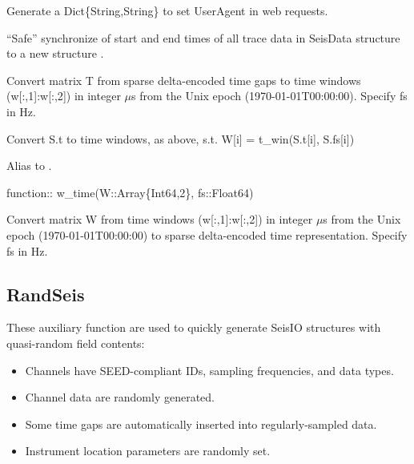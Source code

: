 \documentclass[letterpaper,11pt,english]{sphinxmanual}
\begin{document}
Generate a Dict\{String,String\} to set UserAgent in web requests.

“Safe” synchronize of start and end times of all trace data in SeisData structure  to a new structure .

\begin{fulllineitems}
\label{\detokenize{src/Appendices/function_list:t_win}}
\end{fulllineitems}


Convert matrix T from sparse delta-encoded time gaps to time windows (w{[}:,1{]}:w{[}:,2{]}) in integer \(\mu\)s from the Unix epoch (1970-01-01T00:00:00). Specify fs in Hz.


\begin{fulllineitems}
\end{fulllineitems}


Convert S.t to time windows, as above, s.t. W{[}i{]} = t\_win(S.t{[}i{]}, S.fs{[}i{]})

\begin{fulllineitems}
\label{\detokenize{src/Appendices/function_list:u2d}}
\end{fulllineitems}


Alias to .

function:: w\_time(W::Array\{Int64,2\}, fs::Float64)

Convert matrix W from time windows (w{[}:,1{]}:w{[}:,2{]}) in integer \(\mu\)s from the Unix epoch (1970-01-01T00:00:00) to sparse delta-encoded time representation. Specify fs in Hz.


\subsection{RandSeis}
\label{\detokenize{src/Appendices/function_list:randseis}}
These auxiliary function are used to quickly generate SeisIO structures with quasi-random field contents:
\begin{itemize}
\item {} 
Channels have SEED-compliant IDs, sampling frequencies, and data types.

\item {} 
Channel data are randomly generated.

\item {} 
Some time gaps are automatically inserted into regularly-sampled data.

\item {} 
Instrument location parameters are randomly set.

\end{itemize}
\end{document}
